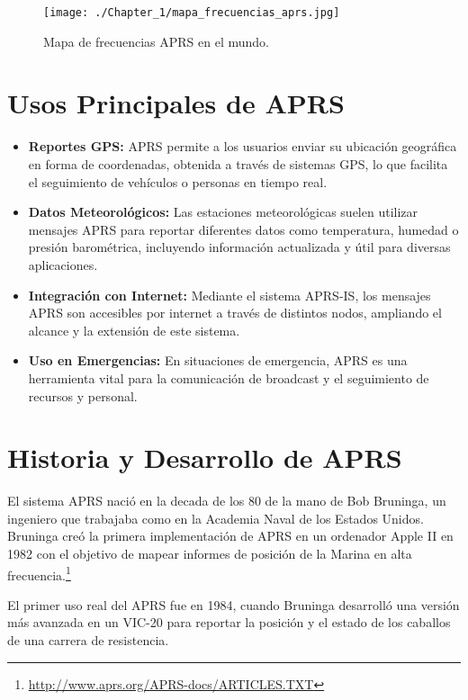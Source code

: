 \begin{figure}
	\centering
	\texttt{[image: ./Chapter\_1/mapa\_frecuencias\_aprs.jpg]}
	\caption{Mapa de frecuencias APRS en el mundo.}
	\label{fig:freq-map}
\end{figure}


\section{Usos Principales de APRS}

\begin{itemize}
	\item \textbf{Reportes GPS:} APRS permite a los usuarios enviar su ubicación geográfica en forma de coordenadas, obtenida a través de sistemas GPS, lo que facilita el seguimiento de vehículos o personas en tiempo real.

	\item \textbf{Datos Meteorológicos:} Las estaciones meteorológicas suelen utilizar mensajes APRS para reportar diferentes datos como temperatura, humedad o presión barométrica, incluyendo información actualizada y útil para diversas aplicaciones.

	\item \textbf{Integración con Internet:} Mediante el sistema APRS-IS, los mensajes APRS son accesibles por internet a través de distintos nodos, ampliando el alcance y la extensión de este sistema.

	\item \textbf{Uso en Emergencias:} En situaciones de emergencia, APRS es una herramienta vital para la comunicación de broadcast y el seguimiento de recursos y personal.
\end{itemize}

\section{Historia y Desarrollo de APRS}

El sistema APRS nació en la decada de los 80 de la mano de Bob Bruninga, un ingeniero que trabajaba como en la Academia Naval de los Estados Unidos. Bruninga creó la primera implementación de APRS en un ordenador Apple II en 1982 con el objetivo de mapear informes de posición de la Marina en alta frecuencia.\footnote{\url{http://www.aprs.org/APRS-docs/ARTICLES.TXT}}

El primer uso real del APRS fue en 1984, cuando Bruninga desarrolló una versión más avanzada en un VIC-20 para reportar la posición y el estado de los caballos de una carrera de resistencia.

